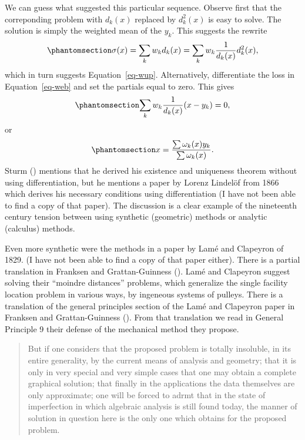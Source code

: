 \documentclass[
  12pt,
  letterpaper,
  DIV=11,
  numbers=noendperiod]{scrartcl}
\theoremstyle{plain}
\theoremstyle{plain}
\theoremstyle{plain}
\theoremstyle{definition}
\theoremstyle{definition}
\theoremstyle{remark}
\begin{document}
We can guess what suggested this particular sequence. Observe first that
the correponding problem with \(d_k(x)\) replaced by \(d_k^2(x)\) is
easy to solve. The solution is simply the weighted mean of the \(y_k\).
This suggests the rewrite \begin{equation}\phantomsection\label{eq-rew}{
\sigma(x)=\sum_k w_kd_k(x)=\sum_kw_k \frac{1}{d_k(x)}d_k^2(x),
}\end{equation} which in turn suggests Equation~\ref{eq-wup}.
Alternatively, differentiate the loss in Equation~\ref{eq-web} and set
the partials equal to zero. This gives
\begin{equation}\phantomsection\label{eq-wstatio1}{
\sum_k w_k\frac{1}{d_k(x)}(x-y_k)=0,
}\end{equation} or \begin{equation}\phantomsection\label{eq-wstatio2}{
x=\frac{\sum\omega_k(x)y_k}{\sum\omega_k(x)}.
}\end{equation} Sturm () mentions that he
derived his existence and uniqueness theorem without using
differentiation, but he mentions a paper by Lorenz Lindelöf from 1866
which derives his necessary conditions using differentiation (I have not
been able to find a copy of that paper). The discussion is a clear
example of the nineteenth century tension between using synthetic
(geometric) methods or analytic (calculus) methods.

Even more synthetic were the methods in a paper by Lamé and Clapeyron of
1829. (I have not been able to find a copy of that paper either). There
is a partial translation in Franksen and Grattan-Guinness
(). Lamé and Clapeyron
suggest solving their ``moindre distances'' problems, which generalize
the single facility location problem in various ways, by ingeneous
systems of pulleys. There is a translation of the general principles
section of the Lamé and Clapeyron paper in Franksen and Grattan-Guinness
(). From that
translation we read in General Principle 9 their defense of the
mechanical method they propose.

\begin{quote}
But if one considers that the proposed problem is totally insoluble, in
its entire generality, by the current means of analysis and geometry;
that it is only in very special and very simple cases that one may
obtain a complete graphical solution; that finally in the applications
the data themselves are only approximate; one will be forced to adrmt
that in the state of imperfection in which algebraic analysis is still
found today, the manner of solution in question here is the only one
which obtains for the proposed problem.
\end{quote}
\end{document}
